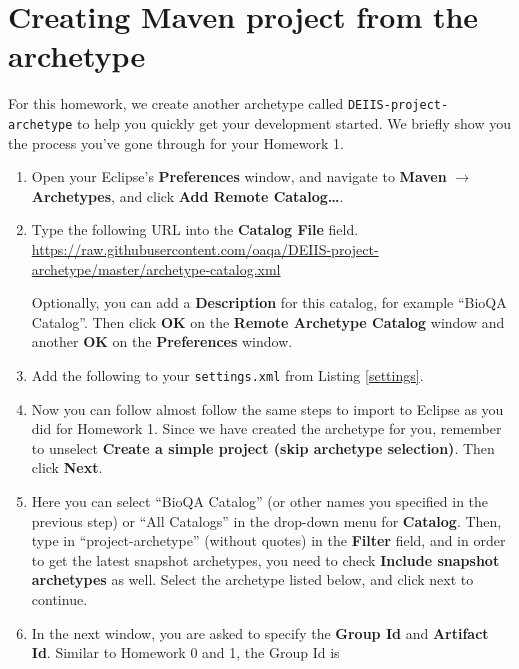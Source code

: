 \section{Creating Maven project from the archetype}
For this homework, we create another archetype called \texttt{DEIIS-project-archetype} to help you quickly get your development started. We briefly show you the process you've gone through for your Homework 1.

\begin{enumerate}

\item Open your Eclipse's \textbf{Preferences} window, and navigate to
\textbf{Maven} $\rightarrow$ \textbf{Archetypes}, and click \textbf{Add Remote
Catalog\ldots}.

\item Type the following URL into the \textbf{Catalog File} field.
\url{https://raw.githubusercontent.com/oaqa/DEIIS-project-archetype/master/archetype-catalog.xml}
\normalsize

Optionally, you can add a \textbf{Description} for this catalog, for example
``BioQA Catalog''. Then click \textbf{OK} on the \textbf{Remote Archetype
Catalog} window and another \textbf{OK} on the \textbf{Preferences} window.
\item Add the following to your \verb|settings.xml| from Listing \ref{settings}.



\item Now you can follow almost follow the same steps to import to Eclipse as you did
for Homework 1. Since we have created the archetype for you, remember to
unselect \textbf{Create a simple project (skip archetype selection)}. Then click
\textbf{Next}.
 
\item Here you can select ``BioQA Catalog'' (or other names you specified
in the previous step) or ``All Catalogs'' in the drop-down menu for
\textbf{Catalog}. Then, type in ``project-archetype'' (without quotes) in the \textbf{Filter}
field, and in order to get the latest snapshot archetypes, you need to check \textbf{Include snapshot archetypes} as well. Select the archetype listed below, and click next to continue.

\item In the next window, you are asked to specify the \textbf{Group Id} and
\textbf{Artifact Id}. Similar to Homework 0 and 1, the Group Id is


\end{enumerate}
